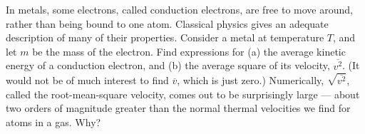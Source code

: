 In metals, some electrons, called conduction electrons, are free to move around, rather than being bound to one
atom. Classical physics gives an adequate description of many of their properties.
Consider a metal at temperature $T$, and let $m$ be the mass of the electron.
Find expressions for (a) the average kinetic energy of a conduction electron,
and (b) the average square of its velocity, $\overline{v^2}$. (It would not be of much interest
to find $\overline{v}$, which is just zero.) Numerically, $\sqrt{\overline{v^2}}$, called the root-mean-square
velocity, comes out to be
surprisingly large --- about two orders of magnitude greater than the normal
thermal velocities we find for atoms in a gas. Why?
\answercheck
{}
